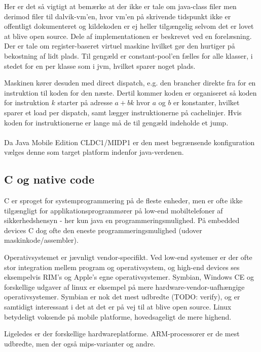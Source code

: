 \documentclass[12pt]{article}
\begin{document}
Her er det så vigtigt at bemærke at der ikke er tale om java-class filer men derimod filer til dalvik-vm'en, hvor vm'en på skrivende tidspunkt ikke er offentligt dokumenteret og kildekoden er ej heller tilgængelig selvom det er lovet at blive open source. Dele af implementationen er beskrevet ved en forelæsning\cite{dalvik-talk}. Der er tale om register-baseret virtuel maskine hvilket gør den hurtiger på bekostning af lidt plads. Til gengæld er constant-pool'en fælles for alle klasser, i stedet for en per klasse som i jvm, hvilket sparer noget plads.

Maskinen kører desuden med direct dispatch, e.g. den brancher direkte fra for en instruktion til koden for den næste. Dertil kommer koden er organiseret så koden for instruktion $k$ starter på adresse $a+bk$ hvor $a$ og $b$ er konstanter, hvilket sparer et load per dispatch, samt lægger instruktionerne på cachelinjer. Hvis koden for instruktionerne er lange må de til gengæld indeholde et jump. 

\paragraph{}
Da Java Mobile Edition CLDC1/MIDP1 er den mest begrænsende konfiguration vælges denne som target platform indenfor java-verdenen.

\subsection{C og native code}
C er sproget for systemprogrammering på de fleste enheder, men er ofte ikke tilgængligt for applikationsprogrammører på low-end mobiltelefoner af sikkerhedshensyn - her kun java en programmeringsmulighed. 
På embedded devices C dog ofte den eneste programmeringsmulighed (udover maskinkode/assembler).

Operativsystemet er jævnligt vendor-specifikt. 
Ved low-end systemer er der ofte stor integration mellem program og operativsystem, og high-end devices ses eksempelvis RIM's og Apple's egne operativsystemer.
Symbian, Windows CE og forskellige udgaver af linux er eksempel på mere hardware-vendor-uafhængige operativsystemer. 
Symbian er nok det mest udbredte (TODO: verify), og er samtidigt interessant i det at det er på vej til at blive open source.
Linux betydeligt voksende på mobile platforme, hovedsageligt de mere highend.

Ligeledes er der forskellige hardwareplatforme. ARM-processorer er de mest udbredte, men der også mips-varianter og andre. 
\end{document}
